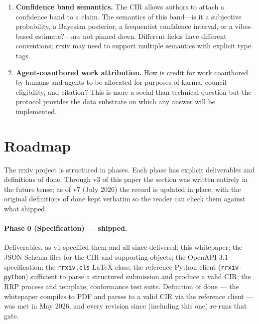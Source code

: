 \documentclass[11pt]{rrxiv}
\begin{document}
\begin{enumerate}[leftmargin=2em, itemsep=0.4em]
\item \textbf{Confidence band semantics.} The CIR allows authors to attach a confidence band to a claim. The semantics of this band---is it a subjective probability, a Bayesian posterior, a frequentist confidence interval, or a vibes-based estimate?---are not pinned down. Different fields have different conventions; rrxiv may need to support multiple semantics with explicit type tags.

\item \textbf{Agent-coauthored work attribution.} How is credit for work coauthored by humans and agents to be allocated for purposes of karma, council eligibility, and citation? This is more a social than technical question but the protocol provides the data substrate on which any answer will be implemented.

\end{enumerate}

\section{Roadmap}
\label{sec:roadmap}

The rrxiv project is structured in phases. Each phase has explicit deliverables and definitions of done. Through v3 of this paper the section was written entirely in the future tense; as of v7 (July 2026) the record is updated in place, with the original definitions of done kept verbatim so the reader can check them against what shipped.

\paragraph{Phase 0 (Specification) --- shipped.} Deliverables, as v1 specified them and all since delivered: this whitepaper; the JSON Schema files for the CIR and supporting objects; the OpenAPI 3.1 specification; the \texttt{rrxiv.cls} LaTeX class; the reference Python client (\texttt{rrxiv-python}) sufficient to parse a structured submission and produce a valid CIR; the RRP process and template; conformance test suite. Definition of done --- the whitepaper compiles to PDF and parses to a valid CIR via the reference client --- was met in May 2026, and every revision since (including this one) re-runs that gate.
\end{document}

